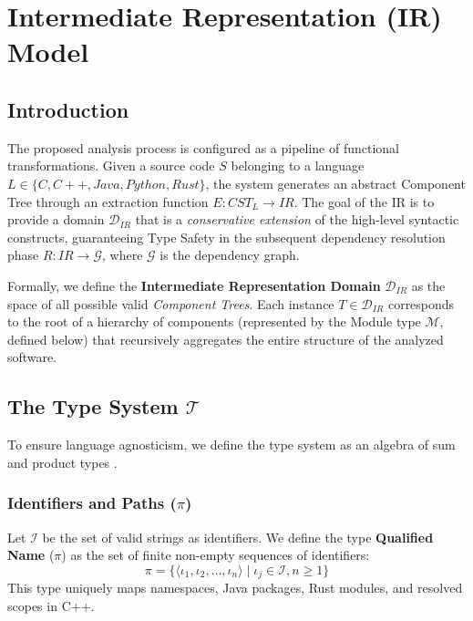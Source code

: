 \chapter{Intermediate Representation (IR) Model}
\label{ch:ir_formalization}

\section{Introduction}
The proposed analysis process is configured as a pipeline of
functional transformations. Given a source code $S$ belonging to a
language $L \in \{C, C++, Java, Python, Rust\}$, the system generates
an abstract Component Tree through an extraction function $E: CST_L
\to IR$. The goal of the IR is to provide a domain $\mathcal{D}_{IR}$
that is a \textit{conservative extension}
\cite{TODO:conservative_extension} of the high-level syntactic
constructs, guaranteeing Type
Safety in the subsequent dependency resolution phase $R: IR \to
\mathcal{G}$, where $\mathcal{G}$ is the dependency graph.

Formally, we define the \textbf{Intermediate Representation Domain}
$\mathcal{D}_{IR}$ as the space of all possible valid
\textit{Component Trees}. Each instance $T \in \mathcal{D}_{IR}$
corresponds to the root of a hierarchy of components (represented by
the Module type $\mathcal{M}$, defined below) that recursively
aggregates the entire structure of the analyzed software.

\section{The Type System $\mathcal{T}$}
To ensure language agnosticism, we define the type system as an
algebra of sum and product types \cite{TODO:algebraic_data_types}.

\subsection{Identifiers and Paths ($\pi$)}
Let $\mathcal{I}$ be the set of valid strings as identifiers. We
define the type \textbf{Qualified Name} ($\pi$) as the set of finite
non-empty sequences of identifiers:
$$\pi = \{ \langle \iota_1, \iota_2, \dots, \iota_n \rangle \mid
\iota_j \in \mathcal{I}, n \geq 1 \}$$
This type uniquely maps namespaces, Java packages, Rust modules, and
resolved scopes in C++.

